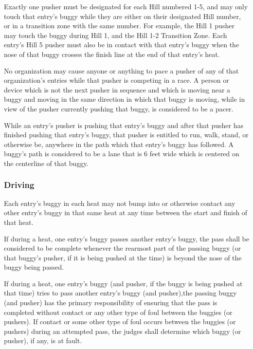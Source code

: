 	Exactly one pusher must be designated for each Hill numbered 1-5, and may only touch that entry's buggy while they are either on their designated Hill number, or in a transition zone with the same number. For example, the Hill 1 pusher may touch the buggy during Hill 1, and the Hill 1-2 Transition Zone. Each entry's Hill 5 pusher must also be in contact with that entry's buggy when the nose of that buggy crosses the finish line at the end of that entry's heat.

	No organization may cause anyone or anything to pace a pusher of any of that organization's entries while that pusher is competing in a race. A person or device which is not the next pusher in sequence and which is moving near a buggy and moving in the same direction in which that buggy is moving, while in view of the pusher currently pushing that buggy, is considered to be a pacer.

	While an entry's pusher is pushing that entry's buggy and after that pusher has finished pushing that entry's buggy, that pusher is entitled to run, walk, stand, or otherwise be, anywhere in the path which that entry's buggy has followed. A buggy's path is considered to be a lane that is 6 feet wide which is centered on the centerline of that buggy.

\subsubsection{Driving}

	Each entry's buggy in each heat may not bump into or otherwise contact any other entry's buggy in that same heat at any time between the start and finish of that heat.

	If during a heat, one entry's buggy passes another entry's buggy, the pass shall be considered to be complete whenever the rearmost part of the passing buggy (or that buggy's pusher, if it is being pushed at the time) is beyond the nose of the buggy being passed.

	If during a heat, one entry's buggy (and pusher, if the buggy is being pushed at that time) tries to pass another entry's buggy (and pusher),the passing buggy (and pusher) has the primary responsibility of ensuring that the pass is completed without contact or any other type of foul between the buggies (or pushers). If contact or some other type of foul occurs between the buggies (or pushers) during an attempted pass, the judges shall determine which buggy (or pusher), if any, is at fault.

